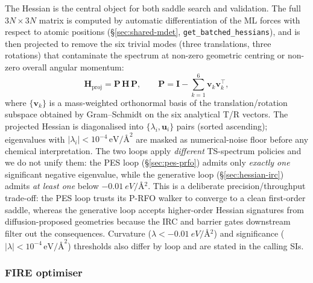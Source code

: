 The Hessian is the central object for both saddle search and validation. The full $3N \times 3N$ matrix is computed by automatic differentiation of the ML forces with respect to atomic positions (\S\ref{sec:shared-mdet}, \texttt{get\_batched\_hessians}), and is then projected to remove the six trivial modes (three translations, three rotations) that contaminate the spectrum at non-zero geometric centring or non-zero overall angular momentum:
\begin{equation}
    \mathbf{H}_\text{proj} = \mathbf{P}\,\mathbf{H}\,\mathbf{P}, \qquad \mathbf{P} = \mathbf{I} - \sum_{k=1}^{6} \mathbf{v}_k \mathbf{v}_k^\top,
\end{equation}
where $\{\mathbf{v}_k\}$ is a mass-weighted orthonormal basis of the translation/rotation subspace obtained by Gram--Schmidt on the six analytical T/R vectors. The projected Hessian is diagonalised into $\{\lambda_i, \mathbf{u}_i\}$ pairs (sorted ascending); eigenvalues with $|\lambda_i| < 10^{-4}\,\text{eV/\AA}^2$ are masked as numerical-noise floor before any chemical interpretation. The two loops apply \emph{different} TS-spectrum policies and we do not unify them: the PES loop (\S\ref{sec:pes-prfo}) admits only \emph{exactly one} significant negative eigenvalue, while the generative loop (\S\ref{sec:hessian-irc}) admits \emph{at least one} below $\SI{-0.01}{eV/\angstrom^2}$. This is a deliberate precision/throughput trade-off: the PES loop trusts its P-RFO walker to converge to a clean first-order saddle, whereas the generative loop accepts higher-order Hessian signatures from diffusion-proposed geometries because the IRC and barrier gates downstream filter out the consequences. Curvature ($\lambda < \SI{-0.01}{eV/\angstrom^2}$) and significance ($|\lambda| < 10^{-4}\,\text{eV/\AA}^2$) thresholds also differ by loop and are stated in the calling SIs.


\subsubsection{FIRE optimiser}
\label{sec:shared-fire}


